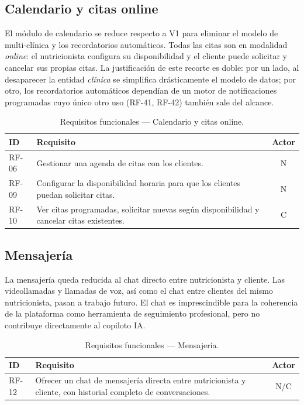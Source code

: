 \subsection{Calendario y citas online}

El módulo de calendario se reduce respecto a V1 para eliminar el modelo de multi-clínica y los recordatorios automáticos. Todas las citas son en modalidad \textit{online}: el nutricionista configura su disponibilidad y el cliente puede solicitar y cancelar sus propias citas. La justificación de este recorte es doble: por un lado, al desaparecer la entidad \emph{clínica} se simplifica drásticamente el modelo de datos; por otro, los recordatorios automáticos dependían de un motor de notificaciones programadas cuyo único otro uso (RF-41, RF-42) también sale del alcance.

\begin{table}[htbp]
\centering
\small
\begin{tabular}{|l|p{10.5cm}|c|}
\hline
\textbf{ID} & \textbf{Requisito} & \textbf{Actor} \\
\hline
RF-06 & Gestionar una agenda de citas con los clientes. & N \\
\hline
RF-09 & Configurar la disponibilidad horaria para que los clientes puedan solicitar citas. & N \\
\hline
RF-10 & Ver citas programadas, solicitar nuevas según disponibilidad y cancelar citas existentes. & C \\
\hline
\end{tabular}
\caption{Requisitos funcionales --- Calendario y citas online.}
\label{tab:rf-calendario}
\end{table}

\subsection{Mensajería}

La mensajería queda reducida al chat directo entre nutricionista y cliente. Las videollamadas y llamadas de voz, así como el chat entre clientes del mismo nutricionista, pasan a trabajo futuro. El chat es imprescindible para la coherencia de la plataforma como herramienta de seguimiento profesional, pero no contribuye directamente al copiloto IA.

\begin{table}[htbp]
\centering
\small
\begin{tabular}{|l|p{10.5cm}|c|}
\hline
\textbf{ID} & \textbf{Requisito} & \textbf{Actor} \\
\hline
RF-12 & Ofrecer un chat de mensajería directa entre nutricionista y cliente, con historial completo de conversaciones. & N/C \\
\hline
\end{tabular}
\caption{Requisitos funcionales --- Mensajería.}
\label{tab:rf-mensajeria}
\end{table}

